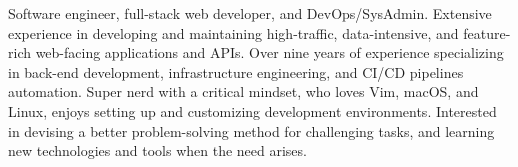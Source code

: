 

\begin{cvparagraph}
Software engineer, full-stack web developer, and DevOps/SysAdmin. Extensive experience in developing and maintaining high-traffic, data-intensive, and feature-rich web-facing applications and APIs.
Over nine years of experience specializing in back-end development, infrastructure engineering, and CI/CD pipelines automation.
Super nerd with a critical mindset, who loves Vim, macOS, and Linux, enjoys setting up and customizing development environments.
Interested in devising a better problem-solving method for challenging tasks, and learning new technologies and tools when the need arises.
\end{cvparagraph}
